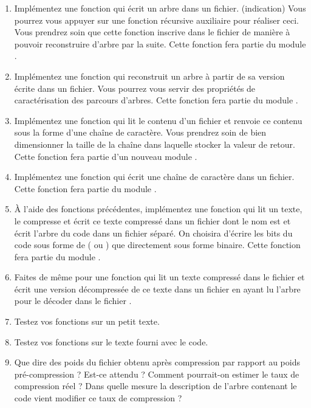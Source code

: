 \documentclass[a4paper, 10pt]{article}
\begin{document}
\begin{enumerate}[resume]
\item Implémentez une fonction  qui écrit un arbre dans un fichier. (indication) Vous pourrez vous appuyer sur une fonction récursive auxiliaire pour réaliser ceci. Vous prendrez soin que cette fonction inscrive dans le fichier de manière à pouvoir reconstruire d'arbre par la suite. Cette fonction fera partie du module .
\item Implémentez une fonction  qui reconstruit un arbre à partir de sa version écrite dans un fichier. Vous pourrez vous servir des propriétés de caractérisation des parcours d'arbres. Cette fonction fera partie du module .
\item Implémentez une fonction  qui lit le contenu d'un fichier et renvoie ce contenu sous la forme d'une chaîne de caractère. Vous prendrez soin de bien dimensionner la taille de la chaîne dans laquelle stocker la valeur de retour. Cette fonction fera partie d'un nouveau module .
\item Implémentez une fonction  qui écrit une chaîne de caractère dans un fichier. Cette fonction fera partie du module .
\item À l'aide des fonctions précédentes, implémentez une fonction  qui lit un texte, le compresse et écrit ce texte compressé dans un fichier dont le nom est  et écrit l'arbre du code dans un fichier séparé. On choisira d'écrire les bits du code sous forme de  ( ou ) que directement sous forme binaire. Cette fonction fera partie du module .
\item Faites de même pour une fonction  qui lit un texte compressé dans le fichier  et écrit une version décompressée de ce texte dans un fichier  en ayant lu l'arbre pour le décoder dans le fichier .
\item Testez vos fonctions sur un petit texte.
\item Testez vos fonctions sur le texte  fourni avec le code.
\item Que dire des poids du fichier obtenu après compression par rapport au poids pré-compression ? Est-ce attendu ? Comment pourrait-on estimer le taux de compression réel ? Dans quelle mesure la description de l'arbre contenant le code vient modifier ce taux de compression ?
\end{enumerate}
\end{document}
